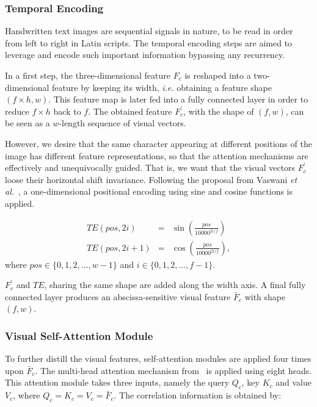 \documentclass[10pt,twocolumn,letterpaper]{article}
\begin{document}
\subsubsection{Temporal Encoding}
\label{sec:te}
Handwritten text images are sequential signals in nature, to be read in order from left to right in Latin scripts. The temporal encoding steps are aimed to leverage and encode such important information bypassing any recurrency. 

In a first step, the three-dimensional feature $F_{c}$ is reshaped into a two-dimensional feature by keeping its width, \emph{i.e.} obtaining a feature shape $(f\times h, w)$. This feature map is later fed into a fully connected layer in order to reduce $f\times h$ back to $f$. The obtained feature $F_{c}^{'}$, with the shape of $(f, w)$, can be seen as a $w$-length sequence of visual vectors.

However, we desire that the same character appearing at different positions of the image has different feature representations, so that the attention mechanisms are effectively and unequivocally guided. That is, we want that the visual vectors $F_{c}^{'}$ loose their horizontal shift invariance. Following the proposal from Vaswani \emph{et al.}~\cite{vaswani2017attention}, a one-dimensional positional encoding using sine and cosine functions is applied.

\begin{eqnarray}
    TE(pos, 2i) &=& \sin{\left(\frac{pos}{10000^{2i/f}}\right)}\nonumber\\
    TE(pos, 2i+1) &=& \cos{\left(\frac{pos}{10000^{2i/f}}\right)},
    \label{eq:TE}
\end{eqnarray}
where $pos \in \{0, 1, 2, \ldots, w-1\}$ and $i \in \{0, 1, 2, \ldots, f-1\}$.

$F_{c}^{'}$ and $TE$, sharing the same shape are added along the width axis. A final fully connected layer produces an abscissa-sensitive visual feature $\bar{F}_{c}$ with shape $(f, w)$.

\subsubsection{Visual Self-Attention Module}
\label{sec:sattn}
To further distill the visual features, self-attention modules are applied four times upon $\bar{F}_{c}$. The multi-head attention mechanism from~\cite{vaswani2017attention} is applied using eight heads. This attention module takes three inputs, namely the query $Q_c$, key $K_c$ and value $V_c$, where $Q_c=K_c=V_c=\bar{F}_{c}$. The correlation information is obtained by:
\end{document}
